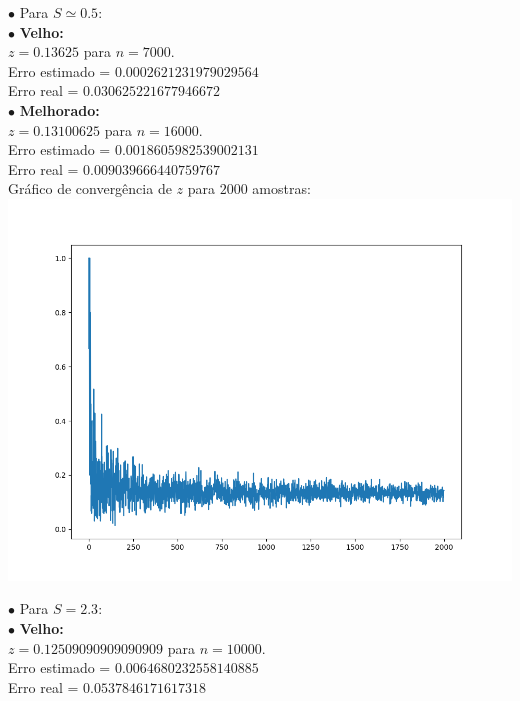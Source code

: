 \documentclass[pt12]{article}
\begin{document}
\indent $\bullet$ Para $S \simeq 0.5$:\\

\indent \indent $\bullet$ \textbf{Velho:}\\

\indent \indent $z  = 0.13625$ para $n = 7000$.\\
\indent \indent Erro estimado = $0.0002621231979029564$\\
\indent \indent Erro real = $0.030625221677946672$\\

\indent \indent $\bullet$ \textbf{Melhorado:}\\

\indent \indent $z  = 0.13100625$ para $n = 16000$.\\
\indent \indent Erro estimado = $0.0018605982539002131$\\
\indent \indent Erro real = $0.009039666440759767$\\
\newpage
\indent \indent Gráfico de convergência de $z$ para $2000$ amostras:\\

\includegraphics[scale=0.5]{ConvergZ_M_1.png}

\indent $\bullet$ Para $S = 2.3$:\\

\indent \indent $\bullet$ \textbf{Velho:}\\

\indent \indent $z  = 0.12509090909090909$ para $n = 10000$.\\
\indent \indent Erro estimado = $0.0064680232558140885$\\
\indent \indent Erro real = $0.0537846171617318$\\
\end{document}
